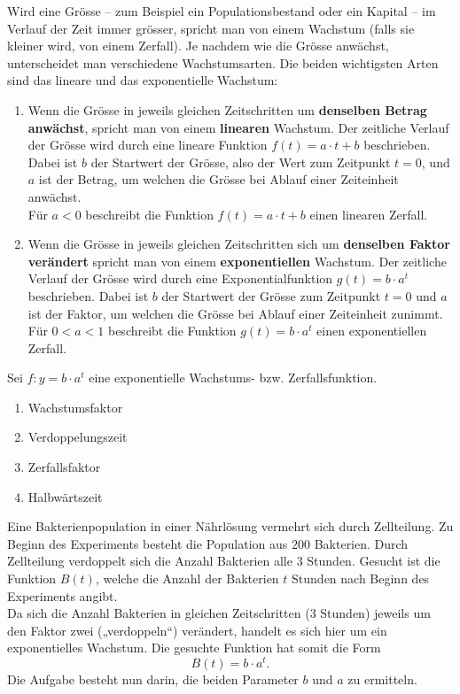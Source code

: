 \documentclass[11pt,oneside]{article}
\begin{document}
	Wird eine Grösse – zum Beispiel ein Populationsbestand oder ein Kapital – im Verlauf der Zeit immer grösser, spricht man von einem Wachstum (falls sie kleiner wird, von einem Zerfall). Je nachdem wie die Grösse anwächst, unterscheidet man verschiedene Wachstumsarten. Die beiden wichtigsten Arten sind das lineare und das exponentielle Wachstum:
	\begin{definition}
		\begin{enumerate}
			\item Wenn die Grösse in jeweils gleichen Zeitschritten um \textbf{denselben Betrag anwächst}, spricht man von einem \textbf{linearen} Wachstum. Der zeitliche Verlauf der Grösse wird durch eine lineare Funktion $f(t)=a\cdot t+b$ beschrieben. Dabei ist $b$ der Startwert der Grösse, also der Wert zum Zeitpunkt $t=0$, und $a$ ist der Betrag, um welchen die Grösse bei Ablauf einer Zeiteinheit anwächst.\\
			Für $a<0$ beschreibt die Funktion $f(t)=a\cdot t+b$ einen linearen Zerfall.
			\item Wenn die Grösse in jeweils gleichen Zeitschritten sich um \textbf{denselben Faktor verändert} spricht man von einem \textbf{exponentiellen} Wachstum. Der zeitliche Verlauf der Grösse wird durch eine Exponentialfunktion $g(t)=b\cdot a^t$ beschrieben. Dabei ist $b$ der Startwert der Grösse zum Zeitpunkt $t=0$ und $a$ ist der Faktor, um welchen die Grösse bei Ablauf einer Zeiteinheit zunimmt.\\
			Für $0<a<1$ beschreibt die Funktion $g(t)=b\cdot a^t$ einen exponentiellen Zerfall.
		\end{enumerate}
	\end{definition}
	\begin{notation}
		Sei $f:y=b\cdot a^t$ eine exponentielle Wachstums- bzw. Zerfallsfunktion.
		\begin{enumerate}[label=\ ]
			\item Wachstumsfaktor 
			\item Verdoppelungszeit 
			\item Zerfallsfaktor 
			\item Halbwärtszeit 
		\end{enumerate}
	\end{notation}
	\begin{beispiel}
		Eine Bakterienpopulation in einer Nährlösung vermehrt sich durch Zellteilung. Zu Beginn des Experiments besteht die Population aus $200$ Bakterien. Durch Zellteilung verdoppelt sich die Anzahl Bakterien alle $3$ Stunden. Gesucht ist die Funktion $B(t)$, welche die Anzahl der Bakterien $t$ Stunden nach Beginn des Experiments angibt.\\
		Da sich die Anzahl Bakterien in gleichen Zeitschritten ($3$ Stunden) jeweils um den Faktor zwei („verdoppeln“) verändert, handelt es sich hier um ein exponentielles Wachstum. Die gesuchte Funktion hat somit die Form \[B(t)=b\cdot a^t.\]
		Die Aufgabe besteht nun darin, die beiden Parameter $b$ und $a$ zu ermitteln.\vspace{5pt}\\
	\end{beispiel}
\end{document}
